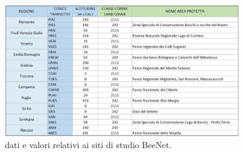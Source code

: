 \documentclass[main.tex]{subfiles}
\begin{document}
\begin{figure}[H]
\centering
\includegraphics[width=0.9\textwidth]{./Immagini/Corine.JPG}
\caption{dati e valori relativi ai siti di studio BeeNet.}
\label{fig:Corine}
\end{figure}
\end{document}
